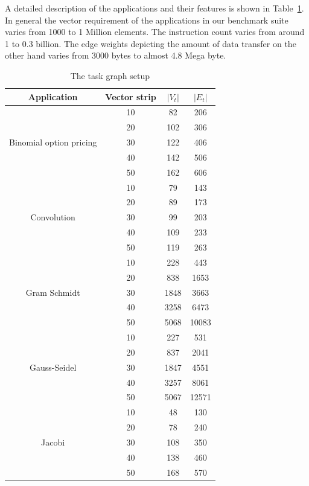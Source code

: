 A detailed description of the applications and their features is shown
in Table~\ref{tab:1}. In general the vector requirement of the
applications in our benchmark suite varies from 1000 to 1 Million
elements. The instruction count varies from around 1 to 0.3 billion. The
edge weights depicting the amount of data transfer on the other hand
varies from 3000 bytes to almost 4.8 Mega byte.

\begin{table}[h!]
  \centering
  \begin{tabular}{|c|c|c|c|}
    \hline
    \textbf{Application} & \textbf{Vector strip} & $|V_t|$ & $|E_t|$ \\
    \hline
    \multirow{5}{*}{Binomial option pricing} & 10 & 82 & 206 \\
    & 20 & 102 & 306 \\
    & 30 & 122 & 406 \\
    & 40 & 142 & 506 \\
    & 50 & 162 & 606 \\
    \hline
    \multirow{5}{*}{Convolution} & 10 & 79 & 143 \\
    & 20 & 89 & 173 \\
    & 30 & 99 & 203 \\
    & 40 & 109 & 233 \\
    & 50 & 119 & 263 \\
    \hline
    \multirow{5}{*}{Gram Schmidt} & 10 & 228 & 443 \\
    & 20 & 838 & 1653 \\
    & 30 & 1848 & 3663 \\
    & 40 & 3258 & 6473 \\
    & 50 & 5068 & 10083\\
    \hline
    \multirow{5}{*}{Gauss-Seidel} & 10 & 227 & 531 \\
    & 20 & 837 & 2041 \\
    & 30 & 1847 & 4551 \\
    & 40 & 3257 & 8061 \\
    & 50 & 5067 & 12571\\
    \hline
    \multirow{5}{*}{Jacobi} & 10 & 48 & 130 \\
    & 20 & 78 & 240 \\
    & 30 & 108 & 350 \\
    & 40 & 138 & 460 \\
    & 50 & 168 & 570\\
    \hline
  \end{tabular}
  \caption{The task graph setup}
  \label{tab:1}
\end{table}

